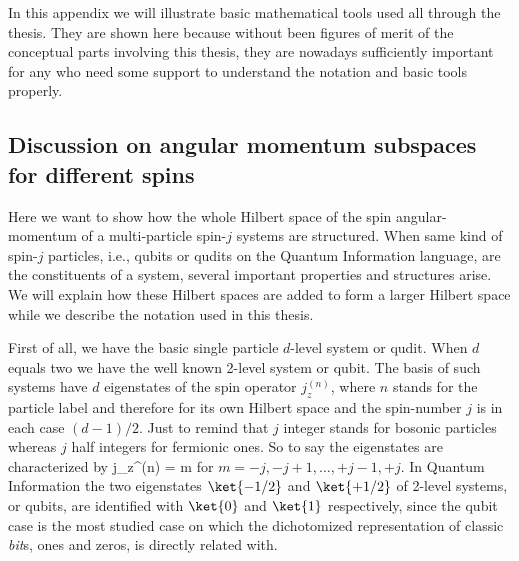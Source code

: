 In this appendix we will illustrate basic mathematical tools used all through the thesis.
They are shown here because without been figures of merit of the conceptual parts involving this thesis, they are nowadays sufficiently important for any who need some support to understand the notation and basic tools properly.

\subsection{Discussion on angular momentum subspaces for different spins}
\label{app:mima-angular-subspaces}

Here we want to show how the whole Hilbert space of the spin angular-momentum of a multi-particle spin-$j$ systems are structured.
When same kind of spin-$j$ particles, i.e., qubits or qudits on the Quantum Information language, are the constituents of a system, several important properties and structures arise.
We will explain how these Hilbert spaces are added to form a larger Hilbert space while we describe the notation used in this thesis.

First of all, we have the basic single particle $d$-level system or qudit.
When $d$ equals two we have the well known 2-level system or qubit.
The basis of such systems have $d$ eigenstates of the spin operator $j_z^{(n)}$, where $n$ stands for the particle label and therefore for its own Hilbert space and the spin-number $j$ is in each case $(d-1)/2$.
Just to remind that $j$ integer stands for bosonic particles whereas $j$ half integers for fermionic ones.
So to say the eigenstates are characterized by
\be
  j_z^{(n)} = m 
\ee
for $m = -j,-j+1,\dots,+j-1,+j$.
In Quantum Information the two eigenstates $\ket{-1/2}$ and $\ket{+1/2}$ of 2-level systems, or qubits, are identified with $\ket{0}$ and $\ket{1}$ respectively, since the qubit case is the most studied case on which the dichotomized representation of classic \emph{bit}s, ones and zeros, is directly related with.

